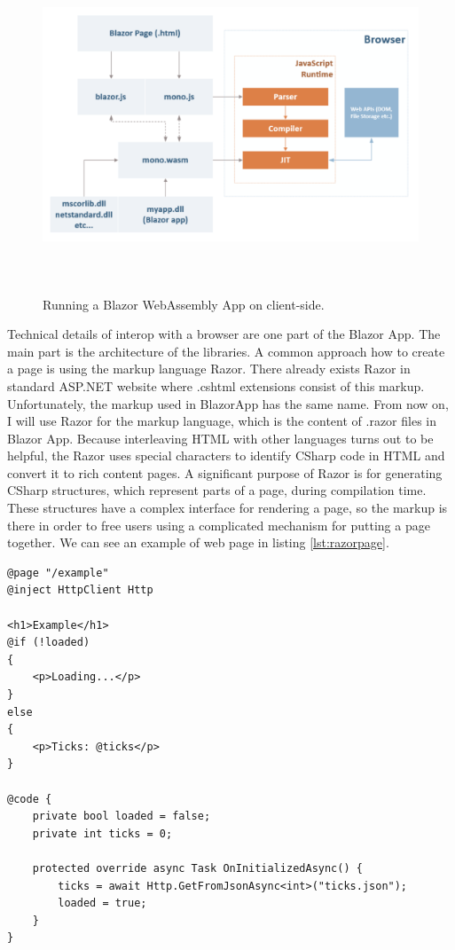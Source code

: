 \begin{figure}[H]\centering
\includegraphics[width=140mm, height=100mm]{./img/BlazorExecution}
\caption{Running a Blazor WebAssembly App on client-side.}
\label{img01:wasm}
\end{figure}

Technical details of interop with a browser are one part of the Blazor App.
The main part is the architecture of the libraries.
A common approach how to create a page is using the markup language Razor.
There already exists Razor in standard ASP.NET website where .cshtml extensions consist of this markup.
Unfortunately, the markup used in BlazorApp has the same name.
From now on, I will use Razor for the markup language, which is the content of .razor files in Blazor App.
Because interleaving HTML with other languages turns out to be helpful, the Razor uses special characters to identify CSharp code in HTML and convert it to rich content pages.
A significant purpose of Razor is for generating CSharp structures, which represent parts of a page, during compilation time.
These structures have a complex interface for rendering a page, so the markup is there in order to free users using a complicated mechanism for putting a page together. 
We can see an example of web page in listing \ref{lst:razorpage}.

\begin{lstlisting}[basicstyle=\small, caption=Example of Razor page., label={lst:razorpage}]
@page "/example"
@inject HttpClient Http

<h1>Example</h1>
@if (!loaded)
{
    <p>Loading...</p>
}
else
{
    <p>Ticks: @ticks</p>
}

@code {
    private bool loaded = false;
    private int ticks = 0;

    protected override async Task OnInitializedAsync() {
        ticks = await Http.GetFromJsonAsync<int>("ticks.json");
        loaded = true;
    }
}
\end{lstlisting}

